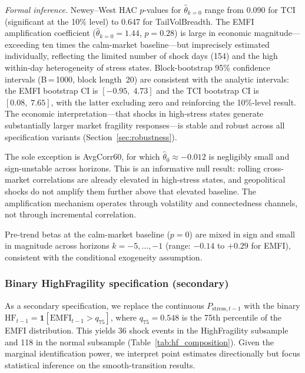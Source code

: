 \documentclass[11pt]{article}
\begin{document}
\textit{Formal inference.}
Newey--West HAC $p$-values for $\hat\theta_{k=0}$ range from 0.090 for
TCI (significant at the 10\% level) to 0.647 for TailVolBreadth.
The EMFI amplification coefficient ($\hat\theta_{k=0} = 1.44$,
$p = 0.28$) is large in economic magnitude---exceeding ten times the
calm-market baseline---but imprecisely estimated individually, reflecting
the limited number of shock days (154) and the high within-day
heterogeneity of stress states.
Block-bootstrap 95\% confidence intervals (B\,=\,1000, block length~20)
are consistent with the analytic intervals: the EMFI bootstrap CI
is $[-0.95,\;4.73]$ and the TCI bootstrap CI is $[0.08,\;7.65]$,
with the latter excluding zero and reinforcing the 10\%-level result.
The economic interpretation---that shocks in high-stress states generate
substantially larger market fragility responses---is stable and robust
across all specification variants (Section~\ref{sec:robustness}).

The sole exception is AvgCorr60, for which $\hat\theta_0 \approx -0.012$
is negligibly small and sign-unstable across horizons. This is an
informative null result: rolling cross-market correlations are already
elevated in high-stress states, and geopolitical shocks do not amplify
them further above that elevated baseline. The amplification mechanism
operates through volatility and connectedness channels, not through
incremental correlation.

Pre-trend betas at the calm-market baseline ($p = 0$) are mixed in sign
and small in magnitude across horizons $k = -5, \ldots, -1$ (range:
$-0.14$ to $+0.29$ for EMFI), consistent with the conditional exogeneity
assumption.

\subsubsection{Binary HighFragility specification (secondary)}
\label{sec:binary_lp}

As a secondary specification, we replace the continuous
$P_{\text{stress},t-1}$ with the binary
$\mathrm{HF}_{t-1} = \mathbf{1}[\mathrm{EMFI}_{t-1} > q_{75}]$, where
$q_{75} = 0.548$ is the 75th percentile of the EMFI distribution.
This yields 36 shock events in the HighFragility subsample and 118 in
the normal subsample (Table~\ref{tab:hf_composition}). Given the
marginal identification power, we interpret point estimates directionally
but focus statistical inference on the smooth-transition results.
\end{document}
